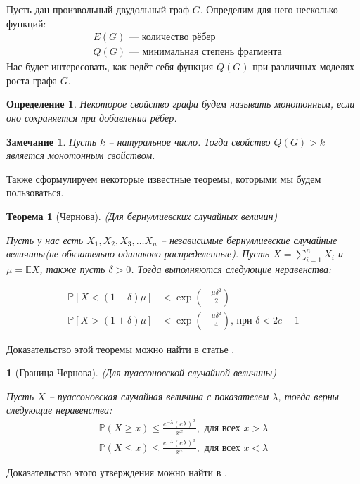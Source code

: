 \documentclass{matmex-diploma-custom}
\newcommand{\Expect}{\mathbb E}
\newcommand{\PRob}{\mathbb P}
\newcommand{\leqs}{\leqslant}
\newcommand{\geqs}{\geqslant}
\newtheorem{note}{Замечание}
\newtheorem{define}{Определение}
\theoremstyle{named}
\newtheorem*{namedtheorem}{Теорема}
\newtheorem*{namedpropo}{}
\begin{document}
Пусть дан произвольный двудольный граф $G$. Определим для него несколько функций:
\begin{align*}
&E(G) \text{ --- количество рёбер}\\
&Q(G) \text{ --- минимальная степень фрагмента}
\end{align*}
Нас будет интересовать, как ведёт себя функция $Q(G)$ при различных моделях роста графа $G$.

\begin{define}
Некоторое свойство графа будем называть монотонным, если оно сохраняется при добавлении рёбер.
\end{define}

\begin{note}
Пусть $k$ -- натуральное число. Тогда свойство $Q(G) > k$ является монотонным свойством.
\end{note}

Также сформулируем некоторые известные теоремы, которыми мы будем пользоваться.
\begin{namedtheorem}[Чернова] (Для бернуллиевских случайных величин) \label{Cher} 

Пусть у нас есть $X_1, X_2, X_3, \dots X_n$ -- 
независимые бернуллиевские случайные величины(не обязательно одинаково распределенные). Пусть $X = \sum\limits_{i = 1}^n X_i$ и
$\mu = \Expect X$, также пусть $\delta > 0$. Тогда выполняются следующие неравенства:

\begin{align}
\PRob[X < (1-\delta)\mu] &< \exp\left(- \frac{\mu \delta^2}{2} \right)
\\
\PRob[X > (1+\delta)\mu] &< \exp\left(- \frac{\mu \delta^2}{4} \right) \text{, при } \delta < 2e - 1
\end{align}
\end{namedtheorem}
Доказательство этой теоремы можно найти в статье \cite{chernov}.

\begin{namedpropo}[Граница Чернова] (Для пуассоновской случайной величины)

Пусть $X$ -- пуассоновская случайная величина с показателем $\lambda$, тогда верны следующие неравенства:
\begin{align} \label{gr_1}
\PRob(X \geqs x) \leqs \frac{e^{-\lambda}(e\lambda)^x}{x^x}, \text{ для всех } x > \lambda 
\\
\label{gr_2}
\PRob(X \leqs x) \leqs \frac{e^{-\lambda}(e\lambda)^x}{x^x}, \text{ для всех } x < \lambda 
\end{align}
\end{namedpropo}
Доказательство этого утверждения можно найти в \cite{chernov_gr}.
\end{document}
